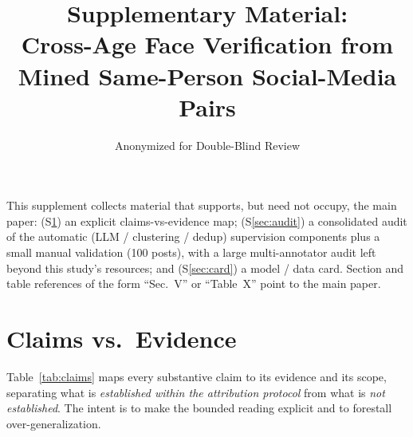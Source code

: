 \documentclass[journal]{IEEEtran}
\begin{document}
\title{Supplementary Material:\\ Cross-Age Face Verification from Mined Same-Person Social-Media Pairs}
\author{Anonymized for Double-Blind Review}
\maketitle

\noindent This supplement collects material that supports, but need not occupy, the main paper:
(S\ref{sec:claims}) an explicit claims-vs-evidence map; (S\ref{sec:audit}) a consolidated audit of
the automatic (LLM / clustering / dedup) supervision components plus a small manual validation
(100 posts), with a large multi-annotator audit left beyond this study's resources; and
(S\ref{sec:card}) a model / data card. Section and table
references of the form ``Sec.~V'' or ``Table~X'' point to the main paper.

\section{Claims vs.\ Evidence}\label{sec:claims}
Table~\ref{tab:claims} maps every substantive claim to its evidence and its scope, separating what
is \emph{established within the attribution protocol} from what is \emph{not established}. The intent
is to make the bounded reading explicit and to forestall over-generalization.
\end{document}
